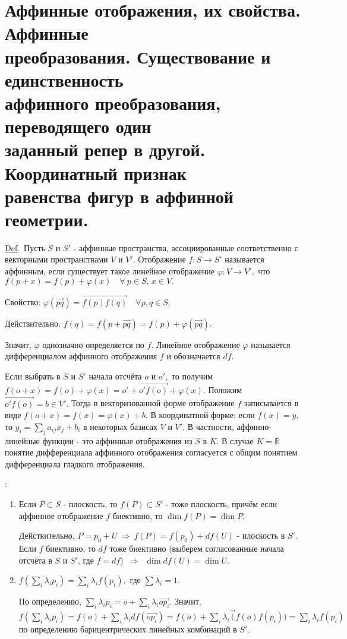 \documentclass[draft]{article}%
\newcommand{\de}{\par\noindent\underline{Def}.\ }%
\newcommand{\ab}{\par\noindent}%
\renewcommand{\phi}{\varphi}
\newcommand{\oi}[1]{\overrightarrow{#1}}%
\begin{document}
\section{Аффинные отображения, их свойства. Аффинные\\ преобразования. Существование и единственность\\ аффинного преобразования, переводящего один\\ заданный репер в другой.
Координатный признак\\ равенства фигур в аффинной геометрии.} %
\label{q42}%
\de Пусть $S$ и $S'$ - аффинные пространства, ассоциированные соответственно с векторными пространствами $V$ и $V'$. Отображение
$f:S\rightarrow S'$ называется аффинным, если существует такое линейное отображение $\phi:V\rightarrow V',$ что
$f(p+x)=f(p)+\phi(x)\quad\forall\ p\in S,\, x\in V.$
\ab Свойство: $\phi(\oi{pq})=\oi{f(p)f(q)}\quad\forall p,q\in S.$
\ab Действительно, $f(q)=f(p+\oi{pq})=f(p)+\phi(\oi{pq}).$
\ab Значит, $\phi$ однозначно определяется по $f$. Линейное отображение $\phi$ называется дифференциалом аффинного отображения $f$
и обозначается $df$.
\ab Если выбрать в $S$ и $S'$ начала отсчёта $o$ и $o',$ то получим $f(o+x)=f(o)+\phi(x)=o'+\oi{o'f(o)}+\phi(x).$ Положим $\oi{o'f(o)}=b\in V'.$
Тогда в векторизованной форме отображение $f$ записывается в виде $f(o+x)=f(x)=\phi(x)+b.$ В координатной форме: если $f(x)=y,$ то
$y_i=\sum\limits_ja_{ij}x_j+b_i$ в некоторых базисах $V$ и $V'$. В частности, аффинно-линейные функции - это аффинные отображения
из $S$ в $K$. В случае $K=\mathbb{R}$ понятие дифференциала аффинного отображения согласуется с общим понятием дифференциала
гладкого отображения.
\ab{\bf Свойства аффинного отображения}:
\begin{enumerate}
    \item Если $P\subset S$ - плоскость, то $f(P)\subset S'$ - тоже плоскость, причём если аффинное отображение $f$ биективно, то $\dim f(P)=\dim P.$
    \ab Действительно, $P=p_0+U\ \Rightarrow\ f(P)=f(p_0)+df(U)$ - плоскость в $S'.$\\ Если $f$ биективно, то $df$ тоже биективно
    (выберем согласованные начала отсчёта в $S$ и $S'$, где $f=df$)\ $\Rightarrow$\ $\dim df(U)=\dim U.$
    \item $f\left(\sum\limits_i\lambda_ip_i\right)=\sum\limits_i\lambda_if(p_i),$ где $\sum\lambda_i=1.$
    \ab По определению, $\sum\limits_i\lambda_ip_i=o+\sum\limits_i\lambda_i\oi{op_i}.$ Значит,\\ $f\left(\sum\limits_i\lambda_ip_i\right)=f(o)+
    \sum\limits_i\lambda_idf(\oi{op_i})=f(o)+\sum\limits_i\lambda_i\oi(f(o)f(p_i))=\sum\limits_i\lambda_if(p_i)$\\ по определению
    барицентрических линейных комбинаций в $S'.$
\end{enumerate}
\end{document}
